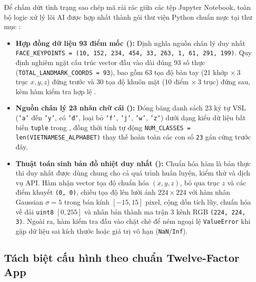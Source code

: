 Để chấm dứt tình trạng sao chép mã rải rác giữa các tệp Jupyter Notebook, toàn bộ logic xử lý lõi AI được hợp nhất thành gói thư viện Python chuẩn mực tại thư mục :
\begin{itemize}
    \item \textbf{Hợp đồng dữ liệu 93 điểm mốc ():} Định nghĩa nguồn chân lý duy nhất \texttt{FACE\_KEYPOINTS = (10, 152, 234, 454, 33, 263, 1, 61, 291, 199)}. Quy định nghiêm ngặt cấu trúc vector đầu vào dài đúng 93 số thực (\texttt{TOTAL\_LANDMARK\_COORDS = 93}), bao gồm 63 tọa độ bàn tay (21 khớp $\times\ 3$ trục $x, y, z$) đứng trước và 30 tọa độ khuôn mặt (10 điểm $\times\ 3$ trục) đứng sau, kèm hàm kiểm tra hợp lệ .
    \item \textbf{Nguồn chân lý 23 nhãn chữ cái ():} Đóng băng danh sách 23 ký tự VSL (\texttt{'a'} đến \texttt{'y'}, có \texttt{'đ'}, loại bỏ \texttt{'f'}, \texttt{'j'}, \texttt{'w'}, \texttt{'z'}) dưới dạng kiểu dữ liệu bất biến \texttt{tuple} trong , đồng thời tính tự động \texttt{NUM\_CLASSES = len(VIETNAMESE\_ALPHABET)} thay thế hoàn toàn các con số \texttt{23} gán cứng trước đây.
    \item \textbf{Thuật toán sinh bản đồ nhiệt duy nhất ():} Chuẩn hóa hàm  là bản thực thi duy nhất được dùng chung cho cả quá trình huấn luyện, kiểm thử và dịch vụ API. Hàm nhận vector tọa độ chuẩn hóa $(x, y, z)$, bỏ qua trục $z$ và các điểm khuyết \texttt{(0, 0)}, chiếu tọa độ lên lưới ảnh $224 \times 224$ với hàm nhân Gaussian $\sigma = 5$ trong bán kính $[-15, 15]$ pixel, cộng dồn tích lũy, chuẩn hóa về dải \texttt{uint8} $[0, 255]$ và nhân bản thành ma trận 3 kênh RGB \texttt{(224, 224, 3)}. Ngoài ra, hàm kiểm tra đầu vào chặt chẽ để ném ngoại lệ \texttt{ValueError} khi gặp dữ liệu sai kích thước hoặc giá trị vô hạn (\texttt{NaN}/\texttt{Inf}).
\end{itemize}

\subsection{Tách biệt cấu hình theo chuẩn Twelve-Factor App}
\label{subsec:cau_hinh_va_nhan}

